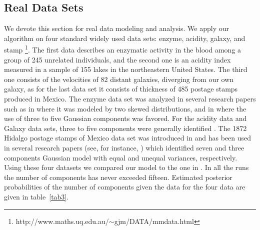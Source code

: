 \documentclass[journal,10pt]{elsart}
\begin{document}
\subsection{Real Data Sets}
We devote this section for real data modeling and analysis.
We apply our algorithm on four standard widely used data sets: enzyme, acidity, galaxy, and stamp \footnote{http://www.maths.uq.edu.au/$\sim$gjm/DATA/mmdata.html}.
The first data describes an enzymatic activity in the blood among a group of 245 unrelated individuals,
and the second one is an acidity index measured in a sample of 155 lakes in the northeastern United States.
The third one consists of the velocities of 82 distant galaxies, diverging from our own galaxy,
as for the last data set it consists of thickness of 485 postage stamps produced in Mexico.
The enzyme data set was analyzed in several research papers such as in \cite{Bechtel1993} where it was modeled by two skewed distributions,
and in \cite{Green1997} where the use of three to five Gaussian components was favored.
For the acidity data and Galaxy data sets, three to five components were generally identified \cite{Green1997}.
The 1872 Hidalgo postage stamps of Mexico data set was introduced in \cite{Izenman1988} and has been used in several research papers
(see, for instance, \cite{Basford1997,Yang2002}) which identified seven and three components Gaussian model with equal and unequal variances, respectively.
Using these four datasets we compared our model to the one in \cite{Green1997}.
In all the runs the number of components has never exceeded fifteen. Estimated posterior probabilities of the number of components given the data for the four data are given in table~\ref{tab3}.
\end{document}
